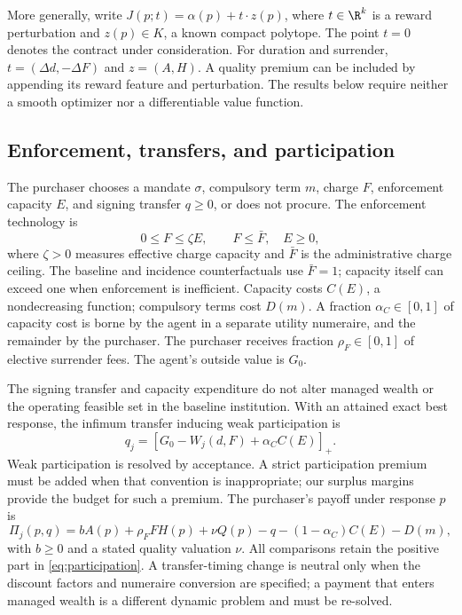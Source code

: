 More generally, write $J(p;t)=\alpha(p)+t\cdot z(p)$, where $t\in\R^k$ is a reward perturbation and $z(p)\in K$, a known compact polytope. The point $t=0$ denotes the contract under consideration. For duration and surrender, $t=(\Delta d,-\Delta F)$ and $z=(A,H)$. A quality premium can be included by appending its reward feature and perturbation. The results below require neither a smooth optimizer nor a differentiable value function.

\subsection{Enforcement, transfers, and participation}
The purchaser chooses a mandate $\sigma$, compulsory term $m$, charge $F$, enforcement capacity $E$, and signing transfer $q\geq0$, or does not procure. The enforcement technology is
\begin{equation}
 0\leq F\leq\zeta E,\qquad F\leq\bar F,\quad E\geq0,
 \label{eq:enforcement}
\end{equation}
where $\zeta>0$ measures effective charge capacity and $\bar F$ is the administrative charge ceiling. The baseline and incidence counterfactuals use $\bar F=1$; capacity itself can exceed one when enforcement is inefficient. Capacity costs $C(E)$, a nondecreasing function; compulsory terms cost $D(m)$. A fraction $\alpha_C\in[0,1]$ of capacity cost is borne by the agent in a separate utility numeraire, and the remainder by the purchaser. The purchaser receives fraction $\rho_F\in[0,1]$ of elective surrender fees. The agent's outside value is $G_0$.

The signing transfer and capacity expenditure do not alter managed wealth or the operating feasible set in the baseline institution. With an attained exact best response, the infimum transfer inducing weak participation is
\begin{equation}
 q_j=[G_0-W_j(d,F)+\alpha_C C(E)]_+.
 \label{eq:participation}
\end{equation}
Weak participation is resolved by acceptance. A strict participation premium must be added when that convention is inappropriate; our surplus margins provide the budget for such a premium. The purchaser's payoff under response $p$ is
\begin{equation}
 \Pi_j(p,q)=bA(p)+\rho_F FH(p)+\nu Q(p)-q-(1-\alpha_C)C(E)-D(m),
 \label{eq:buyer}
\end{equation}
with $b\geq0$ and a stated quality valuation $\nu$. All comparisons retain the positive part in \eqref{eq:participation}. A transfer-timing change is neutral only when the discount factors and numeraire conversion are specified; a payment that enters managed wealth is a different dynamic problem and must be re-solved.

